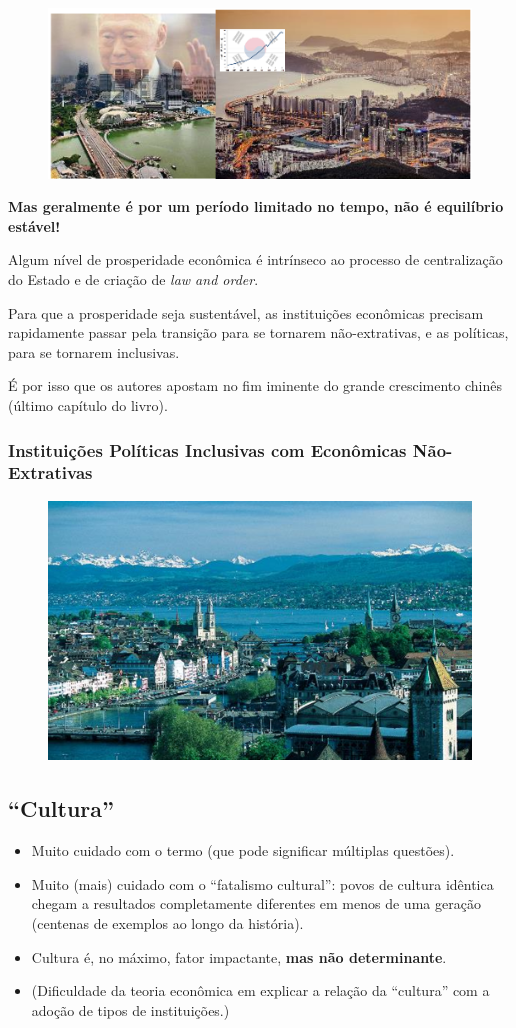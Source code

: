 \documentclass[a4paper,12pt]{article}[abntex2]
\begin{document}
\begin{figure}[H]
    \centering
    \includegraphics[width=0.5\linewidth]{Imagens/a2i5.png}
\end{figure}
\textbf{Mas geralmente é por um período limitado no tempo, não é equilíbrio estável!}

Algum nível de prosperidade econômica é intrínseco ao processo de centralização do Estado e de criação de \textit{law and order}.

Para que a prosperidade seja sustentável, as instituições econômicas precisam rapidamente passar pela transição para se tornarem não-extrativas, e as políticas, para se tornarem inclusivas.

É por isso que os autores apostam no fim iminente do grande crescimento chinês (último capítulo do livro).

\subsubsection{\textbf{Instituições Políticas Inclusivas com Econômicas Não-Extrativas}}

\begin{figure}[H]
    \centering
    \includegraphics[width=0.5\linewidth]{Imagens/a2i6.png}
\end{figure}

\subsection{\textbf{“Cultura”}}
\begin{itemize}
    \item Muito cuidado com o termo (que pode significar múltiplas questões).
    \item Muito (mais) cuidado com o “fatalismo cultural”: povos de cultura idêntica chegam a resultados completamente diferentes em menos de uma geração (centenas de exemplos ao longo da história).
    \item Cultura é, no máximo, fator impactante, \textbf{mas não determinante}.
    \item (Dificuldade da teoria econômica em explicar a relação da “cultura” com a adoção de tipos de instituições.)
\end{itemize}
\end{document}
